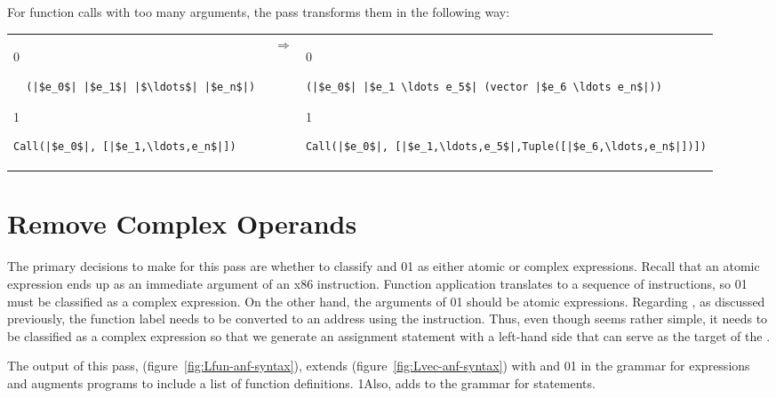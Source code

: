 \documentclass[7x10]{TimesAPriori_MIT}%
\def\racketEd{0}
\def\pythonEd{1}
\def\edition{1}
\newcommand{\racket}[1]{{\if\edition\racketEd{#1}\fi}}
\newcommand{\pythonColor}[0]{}
\newcommand{\python}[1]{{\if\edition\pythonEd\pythonColor #1\fi}}
\numberwithin{theorem}{chapter}
\numberwithin{definition}{chapter}
\numberwithin{equation}{chapter}
\begin{document}
For function calls with too many arguments, the 
pass transforms them in the following way:

\begin{tabular}{lll}
\begin{minipage}{0.3\textwidth}
{\if\edition\racketEd
\begin{lstlisting}
  (|$e_0$| |$e_1$| |$\ldots$| |$e_n$|) 
\end{lstlisting}
\fi}
{\if\edition\pythonEd\pythonColor
\begin{lstlisting}
Call(|$e_0$|, [|$e_1,\ldots,e_n$|])
\end{lstlisting}
\fi}
\end{minipage}
&
$\Rightarrow$
&
\begin{minipage}{0.5\textwidth}
{\if\edition\racketEd
\begin{lstlisting}
(|$e_0$| |$e_1 \ldots e_5$| (vector |$e_6 \ldots e_n$|))
\end{lstlisting}
\fi}
{\if\edition\pythonEd\pythonColor
\begin{lstlisting}
Call(|$e_0$|, [|$e_1,\ldots,e_5$|,Tuple([|$e_6,\ldots,e_n$|])])
\end{lstlisting}
\fi}
\end{minipage}
\end{tabular}


\section{Remove Complex Operands}
\label{sec:rco-r4}

The primary decisions to make for this pass are whether to classify
 and \racket{}\python{} as either
atomic or complex expressions. Recall that an atomic expression 
ends up as an immediate argument of an x86 instruction. Function
application translates to a sequence of instructions, so
\racket{}\python{} must be classified as
a complex expression.  On the other hand, the arguments of
\racket{}\python{} should be atomic
expressions.
%
Regarding , as discussed previously, the function label
needs to be converted to an address using the 
instruction. Thus, even though  seems rather simple, it
needs to be classified as a complex expression so that we generate an
assignment statement with a left-hand side that can serve as the
target of the .

The output of this pass, \LangFunANF{} (figure~\ref{fig:Lfun-anf-syntax}),
extends \LangAllocANF{} (figure~\ref{fig:Lvec-anf-syntax}) with 
and \racket{}\python{} in the grammar for expressions
and augments programs to include a list of function definitions.
%
\python{Also, \LangFunANF{} adds  to the grammar for statements.}
\end{document}
